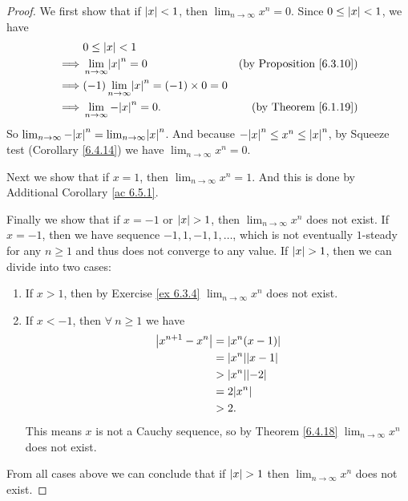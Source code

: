 \begin{proof}
    We first show that if \(\abs*{x} < 1\), then \(\lim_{n \to \infty} x^n = 0\).
    Since \(0 \leq \abs*{x} < 1\), we have
    \begin{align*}
                 & 0 \leq \abs*{x} < 1                                                                           \\
        \implies & \lim_{n \to \infty} \abs*{x}^n = 0                     & \text{(by Proposition \ref{6.3.10})} \\
        \implies & (-1)\lim_{n \to \infty} \abs*{x}^n = (-1) \times 0 = 0                                        \\
        \implies & \lim_{n \to \infty} -\abs*{x}^n = 0.                   & \text{(by Theorem \ref{6.1.19})}
    \end{align*}
    So \(\lim_{n \to \infty} -\abs*{x}^n = \lim_{n \to \infty} \abs*{x}^n\).
    And because \(-\abs*{x}^n \leq x^n \leq \abs*{x}^n\), by Squeeze test (Corollary \ref{6.4.14}) we have \(\lim_{n \to \infty} x^n = 0\).

    Next we show that if \(x = 1\), then \(\lim_{n \to \infty} x^n = 1\).
    And this is done by Additional Corollary \ref{ac 6.5.1}.

    Finally we show that if \(x = -1\) or \(\abs*{x} > 1\), then \(\lim_{n \to \infty} x^n\) does not exist.
    If \(x = -1\), then we have sequence \(-1, 1, -1, 1, \dots\), which is not eventually \(1\)-steady for any \(n \geq 1\) and thus does not converge to any value.
    If \(\abs*{x} > 1\), then we can divide into two cases:
    \begin{enumerate}
        \item If \(x > 1\), then by Exercise \ref{ex 6.3.4} \(\lim_{n \to \infty} x^n\) does not exist.
        \item If \(x < -1\), then \(\forall\ n \geq 1\) we have
              \begin{align*}
                  \abs*{x^{n + 1} - x^n} & = \abs*{x^n(x - 1)}      \\
                                         & = \abs*{x^n}\abs*{x - 1} \\
                                         & > \abs*{x^n}\abs*{-2}    \\
                                         & = 2\abs*{x^n}            \\
                                         & > 2.
              \end{align*}
              This means \(x\) is not a Cauchy sequence, so by Theorem \ref{6.4.18} \(\lim_{n \to \infty} x^n\) does not exist.
    \end{enumerate}
    From all cases above we can conclude that if \(\abs*{x} > 1\) then \(\lim_{n \to \infty} x^n\) does not exist.
\end{proof}

